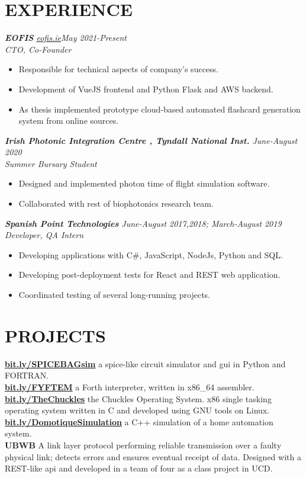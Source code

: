 \documentclass[sectionsleft,centered,10pt]{res}
\let\oldhref\href
\renewcommand{\href}[2]{\oldhref{#1}{\textbf{#2}}}
\begin{document}
\begin{resume}
\section{EXPERIENCE}
{\sl\textbf{EOFIS} \hspace{0.5cm}\oldhref{https://eofis.ie}{eofis.ie}\hfill May 2021-Present}\\
\emph{CTO, Co-Founder}
\begin{itemize}
	\item Responsible for technical aspects of company's success.
	\item Development of VueJS frontend and Python Flask and AWS backend.
	\item As thesis implemented prototype cloud-based automated flashcard generation system from online sources.
\end{itemize}
{\sl\textbf{Irish Photonic Integration Centre , Tyndall National Inst.} \hfill June-August 2020}\\
\emph{Summer Bursary Student}
\begin{itemize}
	\item Designed and implemented photon time of flight simulation software.
	\item Collaborated with rest of biophotonics research team.
\end{itemize}
{\sl\textbf{Spanish Point Technologies} \hfill June-August 2017,2018; March-August 2019}\\
\emph{Developer, QA Intern}
\begin{itemize}
	\item Developing applications with C\#, JavaScript, NodeJs, Python and SQL.
	\item Developing post-deployment tests for React and REST web application.
	\item Coordinated testing of several long-running projects.
\end{itemize}

\section{PROJECTS}
\href{http://bit.ly/SPICEBAGsim}{bit.ly/SPICEBAGsim} a spice-like circuit simulator and gui in Python and FORTRAN.\\
\href{http://bit.ly/FYFTEM}{bit.ly/FYFTEM} a Forth interpreter, written in x86\_64 assembler.\\
\href{https://bit.ly/TheChuckles}{bit.ly/TheChuckles} the Chuckles Operating System. x86 single tasking operating system written in C and developed using GNU tools on Linux.\\
\href{http://bit.ly/DomotiqueSimulation}{bit.ly/DomotiqueSimulation} a C++ simulation of a home automation system.\\
\textbf{UBWB} A link layer protocol performing reliable transmission over a faulty physical link; detects errors and ensures eventual receipt of data. Designed with a REST-like api and developed in a team of four as a class project in UCD.\\


\end{resume}
\end{document}
